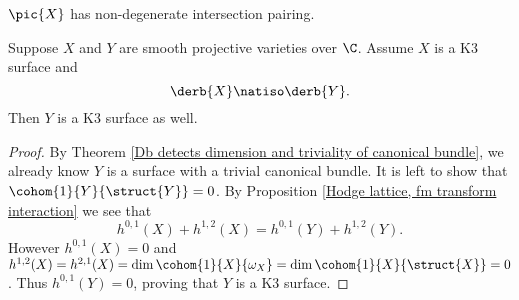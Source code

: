 \begin{proposition}
    \label{Pic has non-degenerate intersection pairing}
    $\pic{X}$ has non-degenerate intersection pairing.
\end{proposition}





\begin{theorem}
    \label{Db(-) detects K3}
    Suppose $X$ and $Y$ are smooth projective varieties over $\C$. Assume $X$ is a K3 surface and
    \[
        \derb{X} \natiso \derb{Y}.
    \]
    Then $Y$ is a K3 surface as well. 
\end{theorem}

\begin{proof}
    By Theorem \ref{Db detects dimension and triviality of canonical bundle}, we already know $Y$ is a surface with a trivial canonical bundle. It is left to show that $\cohom{1}{Y}{\struct{Y}} = 0$. By Proposition \ref{Hodge lattice, fm transform interaction} we see that 
    \[
        h^{0,1}(X) + h^{1,2}(X) = h^{0,1}(Y) + h^{1,2}(Y). 
    \]
    However $h^{0,1}(X) = 0$ and $h^{1,2}(X) = h^{2,1}(X) = \dim \cohom{1}{X}{\omega_X} = \dim \cohom{1}{X}{\struct{X}} = 0$. Thus $h^{0,1}(Y) = 0$, proving that $Y$ is a K3 surface.
\end{proof}

